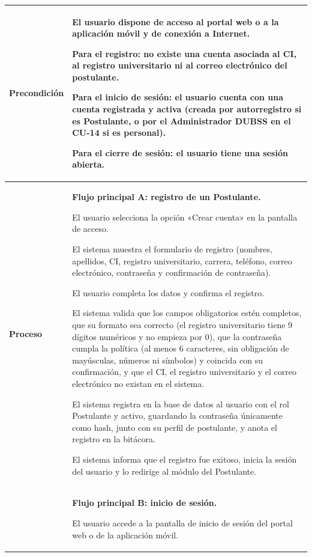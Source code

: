 \begin{longtable}{>{\raggedright\arraybackslash}p{2.9cm} >{\raggedright\arraybackslash}p{12.6cm}}
\midrule
\textbf{Precondición} & \vspace{-\baselineskip}\begin{cuvin}
    \item El usuario dispone de acceso al portal web o a la aplicación móvil y de conexión a Internet.
    \item Para el registro: no existe una cuenta asociada al CI, al registro universitario ni al correo electrónico del postulante.
    \item Para el inicio de sesión: el usuario cuenta con una cuenta registrada y activa (creada por autorregistro si es Postulante, o por el Administrador DUBSS en el CU-14 si es personal).
    \item Para el cierre de sesión: el usuario tiene una sesión abierta.
\end{cuvin} \\
\midrule
\textbf{Proceso} & \textbf{Flujo principal A: registro de un Postulante.}
\begin{cupasos}
    \item El usuario selecciona la opción «Crear cuenta» en la pantalla de acceso.
    \item El sistema muestra el formulario de registro (nombres, apellidos, CI, registro universitario, carrera, teléfono, correo electrónico, contraseña y confirmación de contraseña).
    \item El usuario completa los datos y confirma el registro.
    \item El sistema valida que los campos obligatorios estén completos, que su formato sea correcto (el registro universitario tiene 9 dígitos numéricos y no empieza por 0), que la contraseña cumpla la política (al menos 6 caracteres, sin obligación de mayúsculas, números ni símbolos) y coincida con su confirmación, y que el CI, el registro universitario y el correo electrónico no existan en el sistema.
    \item El sistema registra en la base de datos al usuario con el rol Postulante y activo, guardando la contraseña únicamente como hash, junto con su perfil de postulante, y anota el registro en la bitácora.
    \item El sistema informa que el registro fue exitoso, inicia la sesión del usuario y lo redirige al módulo del Postulante.
\end{cupasos} \\
 & \textbf{Flujo principal B: inicio de sesión.}
\begin{cupasos}
    \item El usuario accede a la pantalla de inicio de sesión del portal web o de la aplicación móvil.

\end{cupasos}
\end{longtable}
